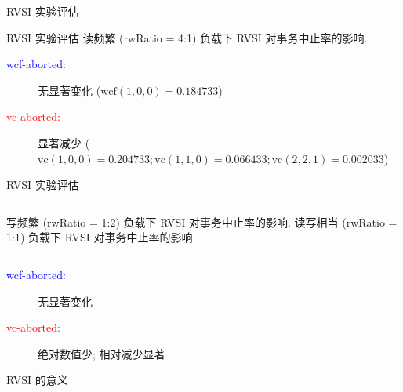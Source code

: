 \begin{frame}{RVSI 实验评估}
  
\end{frame}
\begin{frame}{RVSI 实验评估}
	{读频繁 (rwRatio = 4:1) 负载下 RVSI 对事务中止率的影响.}

  \begin{description}
	\item[\textcolor{blue}{wcf-aborted:}] 
	  无显著变化 {\small ($\text{wcf}(1,0,0) = 0.184733$)}
	  \pause
	\item[\textcolor{red}{vc-aborted:}] 显著减少 
	  {\small ($\text{vc}(1,0,0) = 0.204733;
	  \text{vc}(1,1,0) = 0.066433;
	  \text{vc}(2,2,1) = 0.002033$)}
  \end{description}
\end{frame}
\begin{frame}{RVSI 实验评估}
  \begin{columns}
		{写频繁 (rwRatio = 1:2) 负载下 RVSI 对事务中止率的影响.}
		{读写相当 (rwRatio = 1:1) 负载下 RVSI 对事务中止率的影响.}
  \end{columns}

  \begin{description}
	\item[\textcolor{blue}{wcf-aborted:}] 无显著变化
	\item[\textcolor{red}{vc-aborted:}] 绝对数值少; 相对减少显著 
  \end{description}
\end{frame}
\begin{frame}{RVSI 的意义}
\end{frame}

